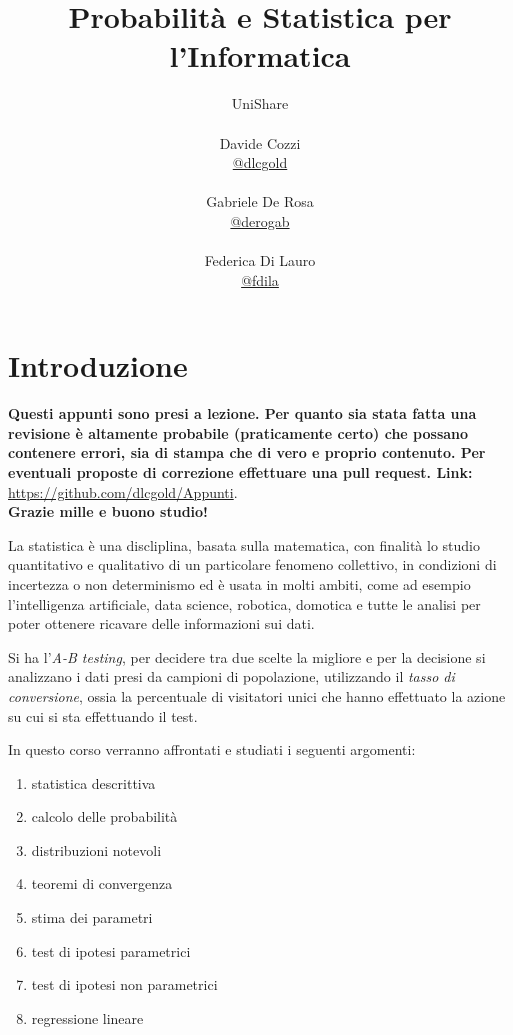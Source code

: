 \documentclass[a4paper,12pt, oneside]{book}
\title{Probabilità e Statistica per l'Informatica}
\author{UniShare\\\\Davide Cozzi\\\href{https://t.me/dlcgold}{@dlcgold}\\\\Gabriele De Rosa\\\href{https://t.me/derogab}{@derogab} \\\\Federica Di Lauro\\\href{https://t.me/f_dila}{@f\textunderscore dila}}
\date{}
\begin{document}
\maketitle
\tableofcontents


\newtheorem{teo}{Teorema}
\newtheorem{definizione}{Definizione}
\newtheorem{esempio}{Esempio}
\newtheorem{corollario}{Corollario}
\newtheorem{lemma}{Lemma}
\newtheorem{osservazione}{Osservazione}
\newtheorem{nota}{Nota}
\newtheorem{esercizio}{Esercizio}
\newcommand{\mean}[1]{\overline #1}
\renewcommand{\chaptermark}[1]{%
\markboth{\chaptername
\ \thechapter.\ #1}{}}
\renewcommand{\sectionmark}[1]{\markright{\thesection.\ #1}}
\chapter{Introduzione}
\textbf{Questi appunti sono presi a lezione. Per quanto sia stata fatta una revisione è altamente probabile (praticamente certo) che possano contenere errori, sia di stampa che di vero e proprio contenuto. Per eventuali proposte di correzione effettuare una pull request. Link: } \url{https://github.com/dlcgold/Appunti}.\\
\textbf{Grazie mille e buono studio!}

La statistica è una discliplina, basata sulla matematica, con finalità lo studio quantitativo e qualitativo
di un particolare fenomeno collettivo, in condizioni di incertezza o non determinismo ed è usata in molti 
ambiti, come ad esempio l'intelligenza artificiale, data science, robotica, domotica e tutte le analisi 
per poter ottenere ricavare delle informazioni sui dati.

Si ha l'\emph{A-B testing}, per decidere tra due scelte la migliore e per la decisione si analizzano i dati
presi da campioni di popolazione, utilizzando il \emph{tasso di conversione}, ossia la percentuale di visitatori unici
che hanno effettuato la azione su cui si sta effettuando il test.

In questo corso verranno affrontati e studiati i seguenti argomenti:
\begin{enumerate}
    \item statistica descrittiva
    \item calcolo delle probabilità
    \item distribuzioni notevoli
    \item teoremi di convergenza
    \item stima dei parametri
    \item test di ipotesi parametrici
    \item test di ipotesi non parametrici
    \item regressione lineare
\end{enumerate}
\end{document}
